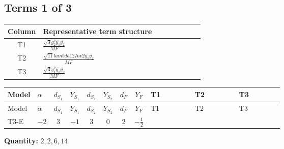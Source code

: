 \documentclass[8pt]{article}
\begin{document}
\begin{landscape}
\subsection*{Terms 1 of 3}
\begin{center}
\begin{tabular}{@{}c >{\raggedright\arraybackslash}p{0.82\linewidth}@{}}
\toprule
Column & Representative term structure \\
\midrule
T1 & \(\displaystyle \frac{\sqrt{3} g_{2}^{2} \overline{y_{1}} \overline{y_{2}}}{MF}\) \\
\midrule
T2 & \(\displaystyle \frac{\sqrt{11} lambda12Inv2 \overline{y_{1}} \overline{y_{2}}}{MF}\) \\
\midrule
T3 & \(\displaystyle \frac{\sqrt{3} g_{1}^{2} \overline{y_{1}} \overline{y_{2}}}{MF}\) \\
\midrule
\bottomrule
\end{tabular}
\end{center}
\smallskip
\tiny
\begin{longtable}{@{}llcccccc >{\raggedright\arraybackslash}p{0.21\linewidth} >{\raggedright\arraybackslash}p{0.21\linewidth} >{\raggedright\arraybackslash}p{0.21\linewidth}@{}}
\toprule
Model & $\alpha$ & $d_{S_1}$ & $Y_{S_1}$ & $d_{S_2}$ & $Y_{S_2}$ & $d_F$ & $Y_F$ & T1 & T2 & T3 \\
\midrule
\endfirsthead
\toprule
Model & $\alpha$ & $d_{S_1}$ & $Y_{S_1}$ & $d_{S_2}$ & $Y_{S_2}$ & $d_F$ & $Y_F$ & T1 & T2 & T3 \\
\midrule
\endhead
T3-E & $-2$ & $3$ & $-1$ & $3$ & $0$ & $2$ & $-\frac{1}{2}$ & \scriptsize\adjustbox{max width=\linewidth}{$\begin{gathered} - \frac{49 \sqrt{3} g_{2}^{2} \overline{y_{1}} \overline{y_{2}}}{24 MF}\end{gathered}$} & \scriptsize\adjustbox{max width=\linewidth}{$\begin{gathered} - \frac{3 \sqrt{11} lambda12Inv2 \overline{y_{1}} \overline{y_{2}}}{22 MF}\end{gathered}$} & \scriptsize\adjustbox{max width=\linewidth}{$\begin{gathered} - \frac{\sqrt{3} g_{1}^{2} \overline{y_{1}} \overline{y_{2}}}{8 MF}\end{gathered}$} \\
\midrule
\bottomrule
\end{longtable}
\clearpage
\noindent\textbf{Quantity: }$\mathrm{2,2,6,14}$\par\smallskip

\end{landscape}
\end{document}
